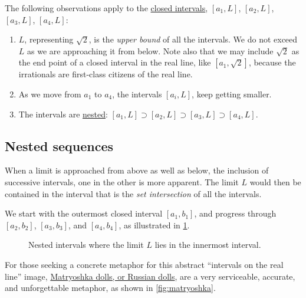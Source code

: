 \documentclass[
  a4paper,
]{article}
\begin{document}
The following observations apply to the
\href{https://mathworld.wolfram.com/ClosedInterval.html}{closed
intervals}, \([a_1, L]\), \([a_2, L]\), \([a_3, L]\), \([a_4, L]\):

\begin{enumerate}
\def\labelenumi{\alph{enumi}.}
\item
  \(L\), representing \(\sqrt{2}\), is the \emph{upper bound} of all the
  intervals. We do not exceed \(L\) as we are approaching it from below.
  Note also that we may include \(\sqrt{2}\) as the end point of a
  closed interval in the real line, like \([a_1, \sqrt{2}]\), because
  the irrationals are first-class citizens of the real line.
\item
  As we move from \(a_1\) to \(a_4\), the intervals \([a_i, L]\), keep
  getting smaller.
\item
  The intervals are
  \href{https://en.wikipedia.org/wiki/Nested_intervals}{nested}:
  \([a_1, L] \supset [a_2, L] \supset [a_3, L] \supset [a_4, L]\).
\end{enumerate}

\subsection{Nested sequences}\label{nested-sequences}

When a limit is approached from above as well as below, the inclusion of
successive intervals, one in the other is more apparent. The limit \(L\)
would then be contained in the interval that is the \emph{set
intersection} of all the intervals.

We start with the outermost closed interval \([a_1, b_1]\), and progress
through \([a_2, b_2]\), \([a_3, b_3]\), and \([a_4, b_4]\), as
illustrated in \cref{fig:nested-bilateral}.

\begin{figure}
\centering

\caption{Nested intervals where the limit \(L\) lies in the innermost
interval.}\label{fig:nested-bilateral}
\end{figure}

For those seeking a concrete metaphor for this abstract ``intervals on
the real line'' image,
\href{https://en.wikipedia.org/wiki/Matryoshka_doll}{Matryoshka dolls,
or Russian dolls}, are a very serviceable, accurate, and unforgettable
metaphor, as shown in \cref{fig:matryoshka}.
\end{document}
